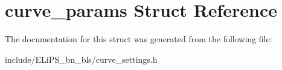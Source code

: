 \hypertarget{structcurve__params}{}\section{curve\+\_\+params Struct Reference}
\label{structcurve__params}


The documentation for this struct was generated from the following file\+:\begin{DoxyCompactItemize}
\item 
include/\+E\+Li\+P\+S\+\_\+bn\+\_\+bls/curve\+\_\+settings.\+h\end{DoxyCompactItemize}
